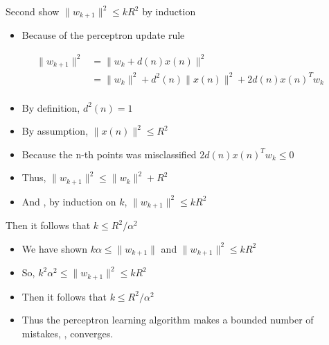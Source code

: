 \documentclass[notes]{beamer}
\providecommand{\tightlist}{%
  \setlength{\itemsep}{0pt}\setlength{\parskip}{0pt}}
\begin{document}
\begin{frame}{Second show \(\|w_{k+1}\|^2\le k R^2\) by induction}

\begin{itemize}
\tightlist
\item
  Because of the perceptron update rule
\end{itemize}

\begin{equation} 
\begin{aligned} 
\|w_{k+1}\|^2& =  \| w_k + d(n)x(n) \|^2 \\  
&=\|w_k\|^2 + d^2(n) \|x(n) \|^2 + 2d(n) x(n)^T w_k\\ 
\end{aligned}
\end{equation}

\begin{itemize}
\tightlist
\item
  By definition, \(d^2(n)=1\)
\item
  By assumption, \(\|x(n)\|^2 \le R^2\)
\item
  Because the n-th points was misclassified \(2d(n)x(n)^Tw_k \le 0\)
\item
  Thus, \(\| w_{k+1} \|^2\le \|w_k\|^2 + R^2\)
\item
  And , by induction on \(k\), \(\|w_{k+1}\|^2 \le k R^2\)
\end{itemize}

\end{frame}

\begin{frame}{Then it follows that \(k\le R^2/\alpha^2\)}

\begin{itemize}
\tightlist
\item
  We have shown \(k\alpha \le \| w_{k+1}\|\) and
  \(\|w_{k+1}\|^2 \le kR^2\)
\item
  So, \(k^2 \alpha^2 \le \|w_{k+1}\|^2 \le k R^2\)
\item
  Then it follows that \(k \le R^2/\alpha^2\)
\item
  Thus the perceptron learning algorithm makes a bounded number of
  mistakes, \ie, converges.
\end{itemize}

\end{frame}
\end{document}
